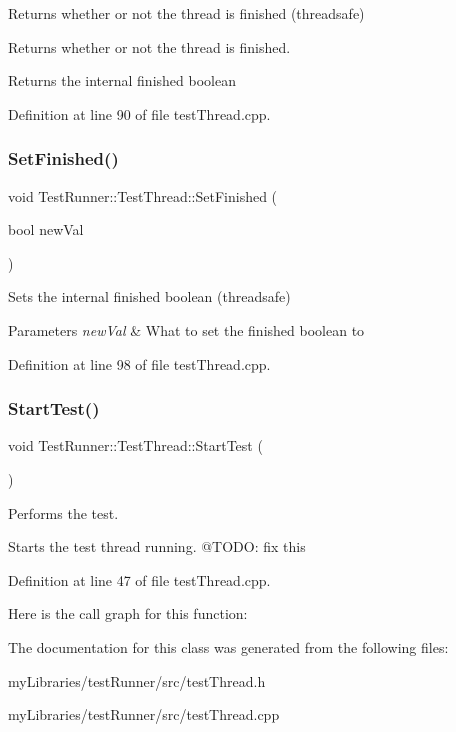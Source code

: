 Returns whether or not the thread is finished (threadsafe) 

Returns whether or not the thread is finished.

\begin{DoxyReturn}{Returns}
the internal finished boolean 
\end{DoxyReturn}


Definition at line 90 of file test\+Thread.\+cpp.

\mbox{\label{classTestRunner_1_1TestThread_ad2ffc72393710905ba51959641c68eb3}} 
\subsubsection{\texorpdfstring{SetFinished()}{SetFinished()}}
{\footnotesize\ttfamily void Test\+Runner\+::\+Test\+Thread\+::\+Set\+Finished (\begin{DoxyParamCaption}\item[{bool}]{new\+Val }\end{DoxyParamCaption})}



Sets the internal finished boolean (threadsafe) 


\begin{DoxyParams}{Parameters}
{\em new\+Val} & What to set the finished boolean to \\
\hline
\end{DoxyParams}


Definition at line 98 of file test\+Thread.\+cpp.

\mbox{\label{classTestRunner_1_1TestThread_a76bafaf7bb25c238bfb86081e1393a2d}} 
\subsubsection{\texorpdfstring{StartTest()}{StartTest()}}
{\footnotesize\ttfamily void Test\+Runner\+::\+Test\+Thread\+::\+Start\+Test (\begin{DoxyParamCaption}{ }\end{DoxyParamCaption})}



Performs the test. 

Starts the test thread running. @\+T\+O\+DO\+: fix this 

Definition at line 47 of file test\+Thread.\+cpp.

Here is the call graph for this function\+:


The documentation for this class was generated from the following files\+:\begin{DoxyCompactItemize}
\item 
my\+Libraries/test\+Runner/src/test\+Thread.\+h\item 
my\+Libraries/test\+Runner/src/test\+Thread.\+cpp\end{DoxyCompactItemize}

